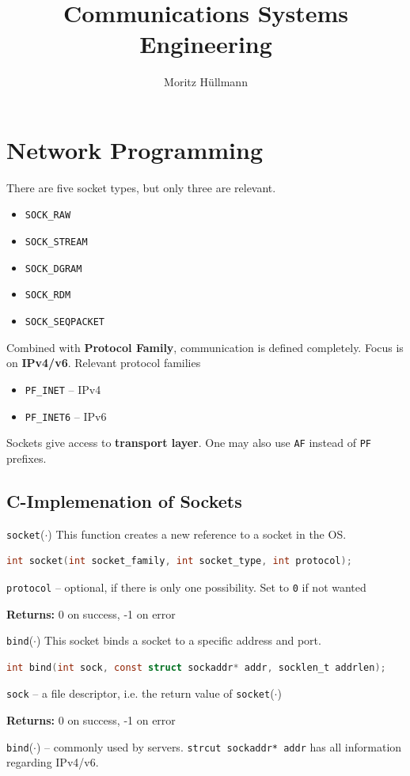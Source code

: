 \documentclass[english]{panikzettel}
\title{Communications Systems Engineering}
\author{Moritz Hüllmann}
\newcommand{\fkt}[1]{\texttt{#1}(\(\cdot\))}
\begin{document}
	\maketitle
	\section{Network Programming}
	There are five socket types, but only three are relevant.
	\begin{itemize}
		\item \texttt{SOCK\_RAW}
		\item \texttt{SOCK\_STREAM}
		\item \texttt{SOCK\_DGRAM}
		\item \texttt{SOCK\_RDM}
		\item \texttt{SOCK\_SEQPACKET}
	\end{itemize}
	Combined with \textbf{Protocol Family}, communication is defined completely.
	Focus is on \textbf{IPv4/v6}.
	Relevant protocol families
	\begin{itemize}
		\item \texttt{PF\_INET} – IPv4
		\item \texttt{PF\_INET6} – IPv6
	\end{itemize}
	Sockets give access to \textbf{transport layer}.
	One may also use \texttt{AF} instead of \texttt{PF} prefixes.
	
	\subsection{C-Implemenation of Sockets}

	\begin{defi}{\fkt{socket}}
		This function creates a new reference to a socket in the OS.
		\begin{lstlisting}[language=C]
			int socket(int socket_family, int socket_type, int protocol);
		\end{lstlisting}
		\tcblower
		\texttt{protocol} – optional, if there is only one possibility. 
		Set to \texttt{0} if not wanted

		\textbf{Returns:} 0 on success, -1 on error
	\end{defi}

	\begin{defi}{\fkt{bind}}
		This socket binds a socket to a specific address and port.
		\begin{lstlisting}[language=C]
			int bind(int sock, const struct sockaddr* addr, socklen_t addrlen);
		\end{lstlisting}
		\tcblower
		\texttt{sock} – a file descriptor, i.e. the return value of \fkt{socket}

		\textbf{Returns:} 0 on success, -1 on error
	\end{defi}
	\fkt{bind} – commonly used by servers.
	\texttt{strcut sockaddr* addr} has all information regarding IPv4/v6.
\end{document}
